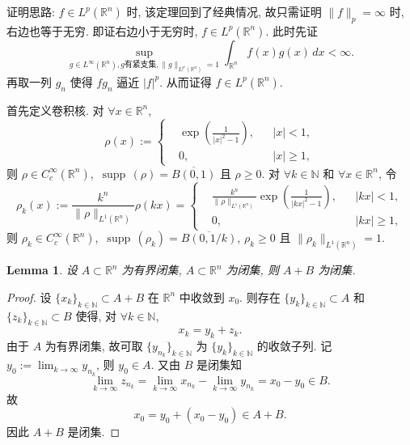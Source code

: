 \documentclass[a4paper,11pt]{article}
\newtheorem{lemma}[theorem]{Lemma}
\theoremstyle{definition}
\def \supp {\mathop\mathrm{\,supp\,}}
\begin{document}
证明思路: $ f \in L^p(\mathbb{R}^n) $ 时, 该定理回到了经典情况, 
故只需证明 $ \| f \|_p = \infty $ 时, 右边也等于无穷. 
即证右边小于无穷时, $ f \in L^p(\mathbb{R}^n) $.
此时先证
$$
    \sup_{g \in L^\infty(\mathbb{R}^n), g \text{有紧支集}, \| g \|_{L^{p'}(\mathbb{R}^n)} = 1} 
        \int_{\mathbb{R}^n} f(x) g(x) \, dx < \infty.
$$
再取一列 $ g_n $ 使得 $ fg_n $ 逼近 $ |f|^p $. 从而证得 $ f \in L^p(\mathbb{R}^n) $.

首先定义卷积核. 对 $ \forall x \in \mathbb{R}^n $,
$$
    \rho(x) := \left\{ \begin{aligned}
        &\exp\left( \frac{1}{|x|^2 - 1} \right), && |x| < 1, \\
        &0,                             && |x| \geq 1,
    \end{aligned}\right.
$$
则 $ \rho \in C_c^\infty(\mathbb{R}^n) $, $ \supp(\rho) = \overline{B(0, 1)} $ 且 $ \rho \geq 0 $. 
对 $ \forall k \in \mathbb{N} $ 和 $ \forall x \in \mathbb{R}^n $, 令
$$
    \rho_k(x) := \frac{k^n}{\| \rho \|_{L^1(\mathbb{R}^n)}} \rho(kx)
        = \left\{ \begin{aligned}
        &\frac{k^n}{\| \rho \|_{L^1(\mathbb{R}^n)}} \exp\left( \frac{1}{|kx|^2 - 1} \right), && |kx| < 1, \\
        &0,                             && |kx| \geq 1,
    \end{aligned}\right.
$$
则 $ \rho_k \in C_c^\infty(\mathbb{R}^n) $, $ \supp(\rho_k) = \overline{B(0, 1/k)} $, $ \rho_k \geq 0 $
且 $ \| \rho_k \|_{L^1(\mathbb{R}^n)} = 1 $. 


\begin{lemma} \label{924}
    设 $ A \subset \mathbb{R}^n $ 为有界闭集, $ A \subset \mathbb{R}^n $ 为闭集, 则 $ A+B $ 为闭集.
\end{lemma}

\begin{proof}
    设 $ \{x_k\}_{k \in \mathbb{N}} \subset A+B $ 在 $ \mathbb{R}^n $ 中收敛到 $ x_0 $.
    则存在 $ \{y_k\}_{k \in \mathbb{N}} \subset A $ 和 $ \{z_k\}_{k \in \mathbb{N}} \subset B $
    使得, 对 $ \forall k \in \mathbb{N} $,
    $$
        x_k = y_k + z_k.
    $$
    由于 $ A $ 为有界闭集, 故可取 $ \{y_{n_k}\}_{k \in \mathbb{N}} $ 为 $ \{y_k\}_{k \in \mathbb{N}} $ 的收敛子列.
    记 $ y_0 := \lim_{k \to \infty} y_{n_k} $, 则 $ y_0 \in A $. 又由 $ B $ 是闭集知
    $$
        \lim_{k \to \infty} z_{n_k} 
            = \lim_{k \to \infty} x_{n_k} - \lim_{k \to \infty} y_{n_k} 
            = x_0 - y_0
            \in B.
    $$
    故
    $$
        x_0 = y_0 + (x_0 - y_0) \in A + B.
    $$
    因此 $ A + B $ 是闭集.
\end{proof}
\end{document}
